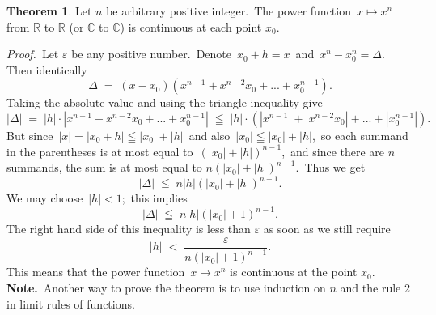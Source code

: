 \documentclass[12pt]{article}
\theoremstyle{definition}
\newtheorem*{thmplain}{Theorem}
\begin{document}
\begin{thmplain}
Let $n$ be arbitrary positive integer.\, The power function\, $x\mapsto x^n$\, from $\mathbb{R}$ to $\mathbb{R}$ (or $\mathbb{C}$ to $\mathbb{C}$) is continuous at each point $x_0$.
\end{thmplain}

{\em Proof.}\, Let $\varepsilon$ be any positive number.\, Denote\, $x_0+h = x$\, and\, $x^n-x_0^n = \Delta$.\, Then identically
       $$\Delta \;=\; (x-x_0)(x^{n-1}+x^{n-2}x_0+...+x_0^{n-1}).$$
Taking the absolute value and using the triangle inequality give
  $$|\Delta| \;=\; |h|\cdot|x^{n-1}+x^{n-2}x_0+...+x_0^{n-1}| \;\leqq\;
    |h|\cdot(|x^{n-1}|+|x^{n-2}x_0|+...+|x_0^{n-1}|).$$
But since\, $|x| = |x_0+h| \leqq |x_0|+|h|$\, and also\, $|x_0| \leqq |x_0|+|h|$,\, so each summand in the parentheses is at most equal to\, $(|x_0|+|h|)^{n-1}$,\, and since there are $n$ summands, the sum is at most equal to $n(|x_0|+|h|)^{n-1}$.\, Thus we get
          $$|\Delta| \;\leqq\; n|h|(|x_0|+|h|)^{n-1}.$$
We may choose\, $|h| < 1$;\, this implies
            $$|\Delta| \;\leqq\; n|h|(|x_0|+1)^{n-1}.$$
The right hand side of this inequality is less than $\varepsilon$ as soon as we still require
                $$|h| \;<\; \frac{\varepsilon}{n(|x_0|+1)^{n-1}}.$$
This means that the power function\, $x\mapsto x^n$ is continuous at the point $x_0$.\\

\textbf{Note.}\, Another way to prove the theorem is to use induction on $n$ and the rule 2 in limit rules of functions.
\end{document}
